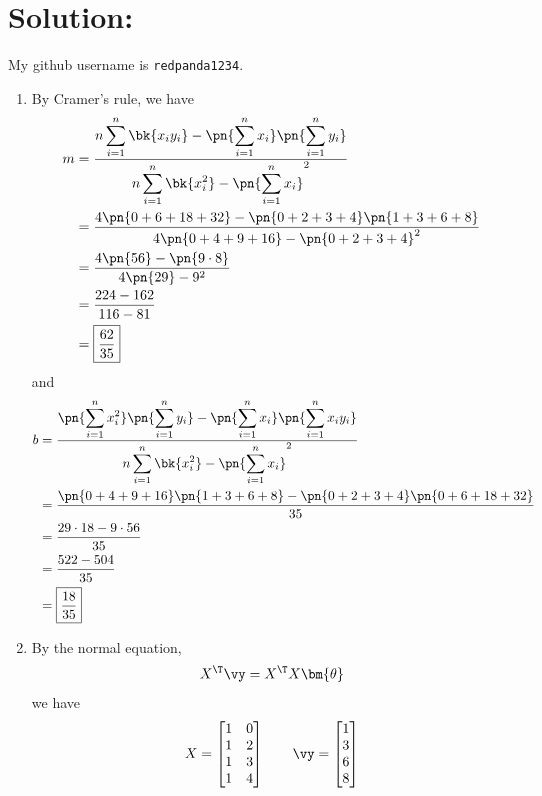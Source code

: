 \documentclass[189]{pset}
\begin{document}
  \section*{Solution:}
  My github username is \texttt{redpanda1234}.
  \begin{enumerate}
    \item By Cramer's rule, we have
      \begin{align*}
        m
        &= \frac{\displaystyle n \sum_{i=1}^n \bk{x_iy_i} -
          \pn{\sum_{i=1}^n x_i}\pn{\sum_{i=1}^n y_i}}{\displaystyle n
          \sum_{i=1}^n \bk{x_i^2} - \pn{\sum_{i=1}^n x_i}^2} \\
        &= \frac{4\pn{0+6+18+32} -
          \pn{0+2+3+4}\pn{1+3+6+8}}{4\pn{0+4+9+16} - \pn{0+2+3+4}^2}
        \\
        &= \frac{4\pn{56} - \pn{9\cdot 8}}{4\pn{29} - 9^2} \\
        &= \frac{224 - 162}{116 - 81} \\
        &= \boxed{\frac{62}{35}}
      \end{align*}
      and
      \begin{align*}
        b
        &= \frac{\displaystyle \pn{\sum_{i=1}^n x_i^2}\pn{\sum_{i=1}^n
          y_i} - \pn{\sum_{i=1}^n x_i}\pn{\sum_{i=1}^n x_iy_i}}{
          \displaystyle n \sum_{i=1}^n \bk{x_i^2} - \pn{\sum_{i=1}^n
          x_i}^2} \\
        &= \frac{\pn{0 + 4 + 9 + 16}\pn{1 + 3 + 6 +8} - \pn{0 + 2 + 3
          + 4}\pn{0 + 6 + 18 + 32}}{35} \\
        &= \frac{29\cdot 18 - 9\cdot 56}{35} \\
        &= \frac{522 - 504}{35} \\
        &= \boxed{\frac{18}{35}}
      \end{align*}
    \item By the normal equation,
      \[
        X^\T \vy = X^\T X \bm{\theta}
      \]
      we have
      \[
        X =
        \begin{bmatrix}
          1 & 0 \\
          1 & 2 \\
          1 & 3 \\
          1 & 4
        \end{bmatrix}
        \qquad
        \vy =
        \begin{bmatrix}
          1 \\
          3 \\
          6 \\
          8

\end{bmatrix}\]
\end{enumerate}
\end{document}
